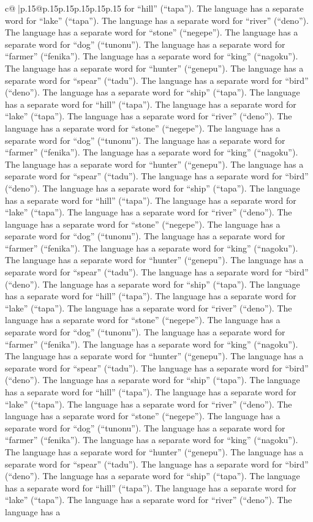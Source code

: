 \documentclass{article}
\begin{document}
{\begin{supertabular}{c@{$\;$}|p{.15\linewidth}@{}p{.15\linewidth}p{.15\linewidth}p{.15\linewidth}p{.15\linewidth}p{.15\linewidth}}
{{{for “hill” (“tapa”). The language has a separate word for “lake” (“tapa”). The language has a separate word for “river” (“deno”). The language has a separate word for “stone” (“negepe”). The language has a separate word for “dog” (“tunonu”). The language has a separate word for “farmer” (“fenika”). The language has a separate word for “king” (“nagoku”). The language has a separate word for “hunter” (“genepu”). The language has a separate word for “spear” (“tadu”). The language has a separate word for “bird” (“deno”). The language has a separate word for “ship” (“tapa”). The language has a separate word for “hill” (“tapa”). The language has a separate word for “lake” (“tapa”). The language has a separate word for “river” (“deno”). The language has a separate word for “stone” (“negepe”). The language has a separate word for “dog” (“tunonu”). The language has a separate word for “farmer” (“fenika”). The language has a separate word for “king” (“nagoku”). The language has a separate word for “hunter” (“genepu”). The language has a separate word for “spear” (“tadu”). The language has a separate word for “bird” (“deno”). The language has a separate word for “ship” (“tapa”). The language has a separate word for “hill” (“tapa”). The language has a separate word for “lake” (“tapa”). The language has a separate word for “river” (“deno”). The language has a separate word for “stone” (“negepe”). The language has a separate word for “dog” (“tunonu”). The language has a separate word for “farmer” (“fenika”). The language has a separate word for “king” (“nagoku”). The language has a separate word for “hunter” (“genepu”). The language has a separate word for “spear” (“tadu”). The language has a separate word for “bird” (“deno”). The language has a separate word for “ship” (“tapa”). The language has a separate word for “hill” (“tapa”). The language has a separate word for “lake” (“tapa”). The language has a separate word for “river” (“deno”). The language has a separate word for “stone” (“negepe”). The language has a separate word for “dog” (“tunonu”). The language has a separate word for “farmer” (“fenika”). The language has a separate word for “king” (“nagoku”). The language has a separate word for “hunter” (“genepu”). The language has a separate word for “spear” (“tadu”). The language has a separate word for “bird” (“deno”). The language has a separate word for “ship” (“tapa”). The language has a separate word for “hill” (“tapa”). The language has a separate word for “lake” (“tapa”). The language has a separate word for “river” (“deno”). The language has a separate word for “stone” (“negepe”). The language has a separate word for “dog” (“tunonu”). The language has a separate word for “farmer” (“fenika”). The language has a separate word for “king” (“nagoku”). The language has a separate word for “hunter” (“genepu”). The language has a separate word for “spear” (“tadu”). The language has a separate word for “bird” (“deno”). The language has a separate word for “ship” (“tapa”). The language has a separate word for “hill” (“tapa”). The language has a separate word for “lake” (“tapa”). The language has a separate word for “river” (“deno”). The language has a }}}
\end{supertabular}}
\end{document}

